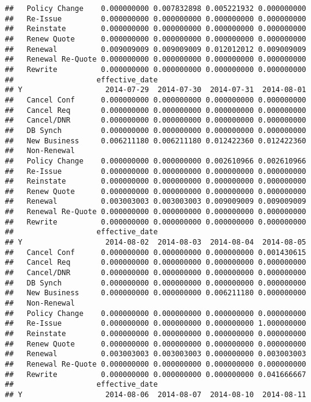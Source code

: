 \documentclass[]{article}
\begin{document}
\begin{verbatim}
##   Policy Change    0.000000000 0.007832898 0.005221932 0.000000000
##   Re-Issue         0.000000000 0.000000000 0.000000000 0.000000000
##   Reinstate        0.000000000 0.000000000 0.000000000 0.000000000
##   Renew Quote      0.000000000 0.000000000 0.000000000 0.000000000
##   Renewal          0.009009009 0.009009009 0.012012012 0.009009009
##   Renewal Re-Quote 0.000000000 0.000000000 0.000000000 0.000000000
##   Rewrite          0.000000000 0.000000000 0.000000000 0.000000000
##                   effective_date
## Y                   2014-07-29  2014-07-30  2014-07-31  2014-08-01
##   Cancel Conf      0.000000000 0.000000000 0.000000000 0.000000000
##   Cancel Req       0.000000000 0.000000000 0.000000000 0.000000000
##   Cancel/DNR       0.000000000 0.000000000 0.000000000 0.000000000
##   DB Synch         0.000000000 0.000000000 0.000000000 0.000000000
##   New Business     0.006211180 0.006211180 0.012422360 0.012422360
##   Non-Renewal                                                     
##   Policy Change    0.000000000 0.000000000 0.002610966 0.002610966
##   Re-Issue         0.000000000 0.000000000 0.000000000 0.000000000
##   Reinstate        0.000000000 0.000000000 0.000000000 0.000000000
##   Renew Quote      0.000000000 0.000000000 0.000000000 0.000000000
##   Renewal          0.003003003 0.003003003 0.009009009 0.009009009
##   Renewal Re-Quote 0.000000000 0.000000000 0.000000000 0.000000000
##   Rewrite          0.000000000 0.000000000 0.000000000 0.000000000
##                   effective_date
## Y                   2014-08-02  2014-08-03  2014-08-04  2014-08-05
##   Cancel Conf      0.000000000 0.000000000 0.000000000 0.001430615
##   Cancel Req       0.000000000 0.000000000 0.000000000 0.000000000
##   Cancel/DNR       0.000000000 0.000000000 0.000000000 0.000000000
##   DB Synch         0.000000000 0.000000000 0.000000000 0.000000000
##   New Business     0.000000000 0.000000000 0.006211180 0.000000000
##   Non-Renewal                                                     
##   Policy Change    0.000000000 0.000000000 0.000000000 0.000000000
##   Re-Issue         0.000000000 0.000000000 0.000000000 1.000000000
##   Reinstate        0.000000000 0.000000000 0.000000000 0.000000000
##   Renew Quote      0.000000000 0.000000000 0.000000000 0.000000000
##   Renewal          0.003003003 0.003003003 0.000000000 0.003003003
##   Renewal Re-Quote 0.000000000 0.000000000 0.000000000 0.000000000
##   Rewrite          0.000000000 0.000000000 0.000000000 0.041666667
##                   effective_date
## Y                   2014-08-06  2014-08-07  2014-08-10  2014-08-11

\end{verbatim}
\end{document}

